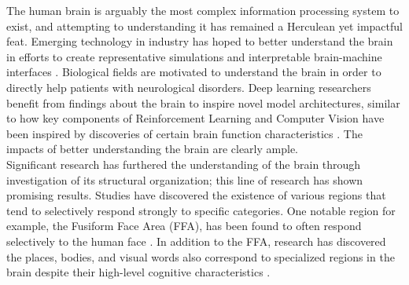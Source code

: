 \documentclass[../thesis.tex]{subfiles}
\begin{document}




The human brain is arguably the most complex information processing system to exist, and attempting to understanding it has remained a Herculean yet impactful feat. Emerging technology in industry has hoped to better understand the brain in efforts to create representative simulations and interpretable brain-machine interfaces \cite{statt_2019, musk2019integrated}. Biological fields are motivated to understand the brain in order to directly help patients with neurological disorders. Deep learning researchers benefit from findings about the brain to inspire novel model architectures, similar to how key components of Reinforcement Learning and Computer Vision have been inspired by discoveries of certain brain function characteristics \cite{lin1992self, fukushima1982neocognitron}. The impacts of better understanding the brain are clearly ample. \\

Significant research has furthered the understanding of the brain through investigation of its structural organization; this line of research has shown promising results. Studies have discovered the existence of various regions that tend to selectively respond strongly to specific categories. One notable region for example, the Fusiform Face Area (FFA), has been found to often respond selectively to the human face \cite{puce1995face}. In addition to the FFA, research has discovered the places, bodies, and visual words also correspond to specialized regions in the brain despite their high-level cognitive characteristics \cite{Kanwisher}. \\
\end{document}
